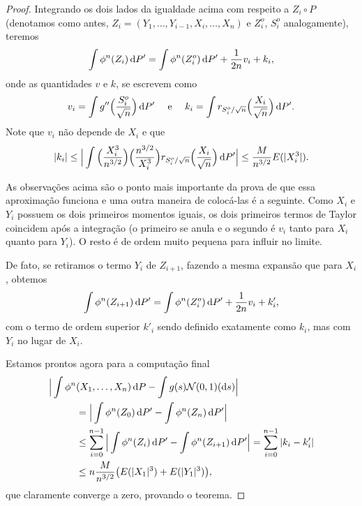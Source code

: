 \begin{proof}
  Integrando os dois lados da igualdade acima com respeito a $Z_i \circ P$ (denotamos como antes, $Z_i = (Y_1, \dots, Y_{i-1}, X_i, \dots, X_n)$ e $Z_i^o$, $S_i^o$ analogamente), teremos
  \begin{equation}
    \int \phi^n(Z_i) \mathop{}\!\mathrm{d} P' = \int \phi^n(Z_i^o) \mathop{}\!\mathrm{d} P' + \frac{1}{2n} v_i + k_i,
  \end{equation}
  onde as quantidades $v$ e $k$, se escrevem como
  \begin{equation}
    v_i = \int g'' \Big( \frac{S_i^o}{\sqrt{n}} \Big) \mathop{}\!\mathrm{d} P' \quad \text{ e } \quad k_i = \int r_{S_i^o/\sqrt{n}} \Big(\frac{X_i}{\sqrt{n}}\Big) \mathop{}\!\mathrm{d} P'.
  \end{equation}
  Note que $v_i$ não depende de $X_i$ e que
  \begin{equation}
    |k_i| \leq \Big| \int \Big(\frac{X_i^3}{n^{3/2}}\Big) \Big(\frac{n^{3/2}}{X_i^3}\Big) r_{S_i^o/\sqrt{n}} \Big(\frac{X_i}{\sqrt{n}}\Big) \mathop{}\!\mathrm{d} P' \Big| \leq \frac{M}{n^{3/2}} E(|X_i^3|).
  \end{equation}

  As observações acima são o ponto mais importante da prova de que essa aproximação funciona e uma outra maneira de colocá-las é a seguinte.
  Como $X_i$ e $Y_i$ possuem os dois primeiros momentos iguais, os dois primeiros termos de Taylor coincidem após a integração (o primeiro se anula e o segundo é $v_i$ tanto para $X_i$ quanto para $Y_i$).
  O resto é de ordem muito pequena para influir no limite.

  De fato, se retiramos o termo $Y_i$ de $Z_{i+1}$, fazendo a mesma expansão que para $X_i$, obtemos
  \begin{equation}
    \int \phi^n(Z_{i+1}) \mathop{}\!\mathrm{d} P' = \int \phi^n(Z_i^o) \mathop{}\!\mathrm{d} P' + \frac{1}{2n} v_i + k'_i,
  \end{equation}
  com o termo de ordem superior $k'_i$ sendo definido exatamente como $k_i$, mas com $Y_i$ no lugar de $X_i$.

  Estamos prontos agora para a computação final
  \begin{equation*}
    \begin{split}
      \Big| \int \phi^n & (X_1, \dots, X_n) \mathop{}\!\mathrm{d} P - \int g(s) \mathcal{N}(0,1)(\mathop{}\!\mathrm{d} s) \Big|\\
      & = \Big| \int \phi^n(Z_0) \mathop{}\!\mathrm{d} P' - \int \phi^n(Z_n) \mathop{}\!\mathrm{d} P' \Big|\\
      & \leq \sum_{i=0}^{n-1} \Big| \int \phi^n(Z_{i}) \mathop{}\!\mathrm{d} P' - \int \phi^n(Z_{i+1}) \mathop{}\!\mathrm{d} P' \Big| = \sum_{i=0}^{n-1} |k_i - k'_i|\\
      & \leq n \frac{M}{n^{3/2}} \big(E(|X_1|^3) + E(|Y_1|^3) \big),
    \end{split}
  \end{equation*}
  que claramente converge a zero, provando o teorema.
\end{proof}

